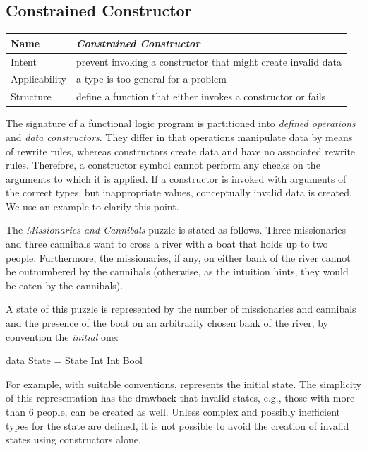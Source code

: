 \subsection{Constrained Constructor}\label{sec-constrained-constructor}

\begin{center}
\begin{tabular}{@{} | *{2}{@{\hspace{3pt}} l @{\hspace{3pt}} |} @{}}
\hline
Name & \emph{Constrained Constructor} \\
\hline 
Intent & prevent invoking a constructor that might create invalid data \\
\hline
Applicability & a type is too general for a problem \\
\hline
Structure & define a function that either invokes a constructor or fails \\
\hline
\end{tabular}
\end{center}
%
The signature of a functional logic program is partitioned into
\emph{defined operations} and \emph{data constructors}.
They differ in that operations manipulate data by means of rewrite rules,
whereas constructors create data and have no associated rewrite rules.
Therefore, a constructor symbol cannot perform any checks on the
arguments to which it is applied.  If a constructor is invoked
with arguments of the correct types, but inappropriate values,
conceptually invalid data is created.
We use an example to clarify this point.

The \emph{Missionaries and Cannibals} puzzle is stated as follows.
Three missionaries and three cannibals want to cross a river
with a boat that holds up to two people.
Furthermore, the missionaries, if any, on either bank of the river
cannot be outnumbered by the cannibals
(otherwise, as the intuition hints, they would be eaten by the cannibals).

A state of this puzzle is represented by the number of
missionaries and cannibals and the presence of the boat on an
arbitrarily chosen bank of the river, by convention the \emph{initial} one:
%
\begin{curry}
data State = State Int Int Bool
\end{curry}
%
For example, with suitable conventions,
 represents the initial state.
The simplicity of this representation has the drawback
that invalid states, e.g., those with more than 6 people,
can be created as well.
Unless complex and possibly inefficient types for the state are
defined, it is not possible to avoid the creation of invalid states
using constructors alone.


